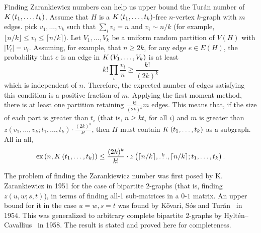 \begin{remark}\label{rem:zar_vs_turan}
    Finding Zarankiewicz numbers can help us upper bound the Turán number of $K\left(t_1, \dots, t_k\right)$.
    Assume that $H$ is a $K\left(t_1, \dots, t_k\right)$-free $n$-vertex $k$-graph with $m$ edges.
    pick $v_1, \dots, v_k$ such that $\sum_{i} v_i = n $ and $v_i \sim n/k $
    (for example, $\lfloor n/k \rfloor \leq v_i \leq \lceil n/k \rceil$).
    Let $V_1, \dots, V_k$ be a uniform random partition of $V(H)$ with $|V_i| = v_i$.
    Assuming, for example, that $n \geq 2k$,
    for any edge $e \in E(H)$, the probability that $e$ is an edge in $K\left(V_1, \dots, V_k\right)$ is
    at least
    \[
        k! \prod_i \frac{v_i}{n} \geq \frac{k!}{(2k)^k}
    \]
    which is independent of $n$.
    Therefore, the expected number of edges satisfying this condition is a positive fraction of $m$.
    Applying the first moment method, there is at least one partition retaining $ \frac{k!}{(2k)^k} m$ edges.
    This means that, if the size of each part is greater than $t_i$ (that is, $n \geq k t_i$ for all $i$)
    and $m$ is greater than $z(v_1, \dots, v_k; t_1, \dots, t_k) \cdot \frac{(2k)^k}{k!}$, then
    $H$ must contain $K\left(t_1, \dots, t_k\right)$ as a subgraph.
    All in all,
    \[
        \text{ex} \left( n, K\left(t_1, \dots, t_k\right) \right) \leq \frac{(2k)^k}{k!} \cdot z\left(\lceil n / k \rceil, \overset{k}{\dots}, \lceil n / k \rceil; t_1, \dots, t_k\right).
    \]

\end{remark}

The problem of finding the Zarankiewicz number was first posed by K. Zarankiewicz in 1951 for the
case of bipartite 2-graphs (that is, finding $z(u, w; s, t)$),
in terms of finding all-1 sub-matrices in a $0$-$1$ matrix.
An upper bound for it in the case $u=w, s=t$ was found by Kővari, Sós and Turán~\cite{Kovari1954} in 1954.
This was generalized to arbitrary complete
bipartite 2-graphs by Hyltén--Cavallius~\cite{Hylten1958} in 1958.
The result is stated and proved here for completeness.

